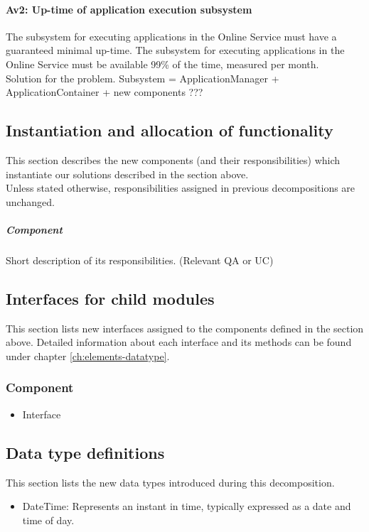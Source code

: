     \paragraph{Av2: Up-time of application execution subsystem}
        The subsystem for executing applications in the Online Service must
        have a guaranteed minimal up-time. The subsystem for executing
        applications in the Online Service must be available
        99\% of the time, measured per month. \\
        Solution for the problem.
        Subsystem = ApplicationManager + ApplicationContainer + new components ???


\subsection{Instantiation and allocation of functionality}
    This section describes the new components (and their responsibilities)
    which instantiate our solutions described in the section above. \\
    Unless stated otherwise, responsibilities assigned in previous decompositions are unchanged.

    \subparagraph{Component}
        Short description of its responsibilities. (Relevant QA or UC)


\subsection{Interfaces for child modules}
    This section lists new interfaces assigned to the components defined
    in the section above. Detailed information about each interface and
    its methods can be found under chapter \ref{ch:elements-datatype}. \\

    \subsubsection{Component}
        \begin{itemize}
            \item Interface
        \end{itemize}

\subsection{Data type definitions}
    This section lists the new data types introduced during this decomposition.

    \begin{itemize}
        \item DateTime: Represents an instant in time, typically expressed as a date and time of day.
    \end{itemize}
